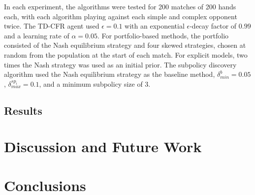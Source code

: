 \documentclass{aamas2013}
\begin{document}
    In each experiment, the algorithms were tested for 200 matches of 200 hands each, with each algorithm playing against each simple and complex opponent twice. The TD-CFR agent used $\epsilon=0.1$ with an exponential $\epsilon$-decay factor of $0.99$ and a learning rate of $\alpha=0.05$. For portfolio-based methods, the portfolio consisted of the Nash equilibrium strategy and four skewed strategies, chosen at random from the population at the start of each match. For explicit models, two times the Nash strategy was used as an initial prior. The subpolicy discovery algorithm used the Nash equilibrium strategy as the baseline method, $\delta_{min}^{b}=0.05$, $\delta_{max}^{sp_i}=0.1$, and a minimum subpolicy size of 3.
    \subsection{Results}


\section{Discussion and Future Work}

\section{Conclusions}

%

%
%

\end{document}
